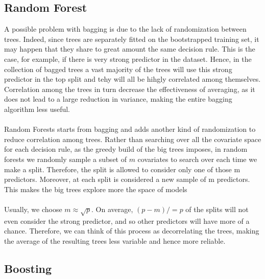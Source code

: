 \documentclass[a4paper,11pt]{article}
\begin{document}
\subsection{Random Forest}
A possible problem with bagging is due to the lack of randomization between trees. Indeed, since trees are separately fitted on the bootstrapped training set, it may happen that they share to great amount the same decision rule. This is the case, for example, if there is very strong predictor in the dataset. Hence, in the collection of bagged trees a vast majority of the trees will use this strong predictor in the top split and tehy will all be hihgly correlated among themselves.
\\Correlation among the trees in turn decrease the effectiveness of averaging, as it does not lead to a large reduction in variance, making the entire bagging algorithm less useful. 
\\\\ Random Forests starts from bagging and adds another kind of randomization to reduce correlation among trees. Rather than searching over all the covariate space for each decision rule, as the greedy build of the big trees imposes, in random forests we randomly sample a subset of $m$ covariates to search over each time we make a split. Therefore, the split is allowed to consider only one of those m predictors. Moreover, at each split is considered a new sample of m predictors. This makes the big trees explore more the space of models
\\\\Usually, we choose $m \approx \sqrt{p}$.
On average, $(p - m)/ = p$ of the splits will not even consider the strong predictor, and so other predictors will have more of a chance. Therefore, we can think of this process as decorrelating the trees, making the average of the resulting trees less variable and hence more reliable.


\subsection{Boosting}
\end{document}
